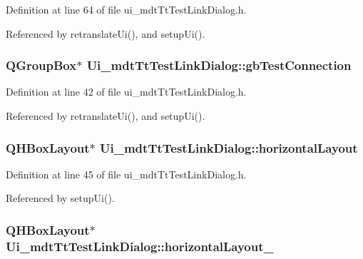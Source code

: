 Definition at line 64 of file ui\-\_\-mdt\-Tt\-Test\-Link\-Dialog.\-h.



Referenced by retranslate\-Ui(), and setup\-Ui().

\hypertarget{class_ui__mdt_tt_test_link_dialog_a27997952a74a4c5c8dbacb75870aea55}{
\subsubsection[{gb\-Test\-Connection}]{\setlength{\rightskip}{0pt plus 5cm}Q\-Group\-Box$\ast$ Ui\-\_\-mdt\-Tt\-Test\-Link\-Dialog\-::gb\-Test\-Connection}}\label{class_ui__mdt_tt_test_link_dialog_a27997952a74a4c5c8dbacb75870aea55}


Definition at line 42 of file ui\-\_\-mdt\-Tt\-Test\-Link\-Dialog.\-h.



Referenced by retranslate\-Ui(), and setup\-Ui().

\hypertarget{class_ui__mdt_tt_test_link_dialog_ae2016e70f10416494ea4a2f8256fae9f}{
\subsubsection[{horizontal\-Layout}]{\setlength{\rightskip}{0pt plus 5cm}Q\-H\-Box\-Layout$\ast$ Ui\-\_\-mdt\-Tt\-Test\-Link\-Dialog\-::horizontal\-Layout}}\label{class_ui__mdt_tt_test_link_dialog_ae2016e70f10416494ea4a2f8256fae9f}


Definition at line 45 of file ui\-\_\-mdt\-Tt\-Test\-Link\-Dialog.\-h.



Referenced by setup\-Ui().

\hypertarget{class_ui__mdt_tt_test_link_dialog_aab35977239cf35d2091d160eded59834}{
\subsubsection[{horizontal\-Layout\-\_\-2}]{\setlength{\rightskip}{0pt plus 5cm}Q\-H\-Box\-Layout$\ast$ Ui\-\_\-mdt\-Tt\-Test\-Link\-Dialog\-::horizontal\-Layout\-\_}}\label{class_ui__mdt_tt_test_link_dialog_aab35977239cf35d2091d160eded59834}


